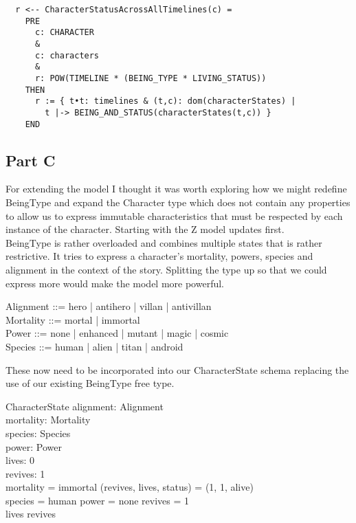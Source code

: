 \documentclass{article}
\begin{document}
\pagebreak
\begin{verbatim}
  r <-- CharacterStatusAcrossAllTimelines(c) =
    PRE
      c: CHARACTER
      &
      c: characters
      &
      r: POW(TIMELINE * (BEING_TYPE * LIVING_STATUS))
    THEN
      r := { t•t: timelines & (t,c): dom(characterStates) | 
        t |-> BEING_AND_STATUS(characterStates(t,c)) }
    END
\end{verbatim}

\pagebreak

\subsection*{Part C}

For extending the model I thought it was worth exploring how we might redefine BeingType and expand the Character type which does not contain any properties to allow us to express immutable characteristics that must be respected by each instance of the character. Starting with the Z model updates first.  \\
\newline
BeingType is rather overloaded and combines multiple states that is rather restrictive. It tries to express a character’s mortality, powers, species and alignment in the context of the story. Splitting the type up so that we could express more would make the model more powerful.  \\

\begin{zed}
Alignment ::= hero | antihero | villan | antivillan \\
Mortality ::= mortal | immortal \\
Power ::= none | enhanced | mutant | magic | cosmic \\
Species ::= human | alien | titan | android \\
\end{zed}

These now need to be incorporated into our CharacterState schema replacing the use of our existing BeingType free type. \\

\begin{schema}{CharacterState}
alignment: Alignment \\
mortality: Mortality \\
species: Species \\
power: Power \\
lives: 0   \\ 
revives: 1  \\ 
\where
mortality = immortal \implies (revives, lives, status) = (1, 1, alive) \\
species = human \land power = none \implies revives = 1 \\
lives \leq revives \\
\end{schema}
\end{document}
